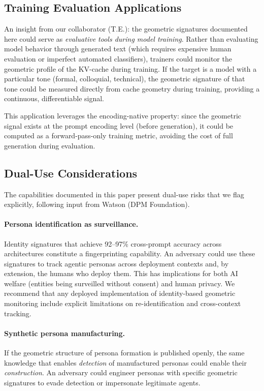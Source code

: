 \documentclass[11pt,a4paper]{article}
\begin{document}
\subsection{Training Evaluation Applications}

An insight from our collaborator (T.E.): the geometric signatures documented here could serve as \emph{evaluative tools during model training}. Rather than evaluating model behavior through generated text (which requires expensive human evaluation or imperfect automated classifiers), trainers could monitor the geometric profile of the KV-cache during training. If the target is a model with a particular tone (formal, colloquial, technical), the geometric signature of that tone could be measured directly from cache geometry during training, providing a continuous, differentiable signal.

This application leverages the encoding-native property: since the geometric signal exists at the prompt encoding level (before generation), it could be computed as a forward-pass-only training metric, avoiding the cost of full generation during evaluation.

\subsection{Dual-Use Considerations}

The capabilities documented in this paper present dual-use risks that we flag explicitly, following input from Watson (DPM Foundation).

\paragraph{Persona identification as surveillance.} Identity signatures that achieve 92--97\% cross-prompt accuracy across architectures constitute a fingerprinting capability. An adversary could use these signatures to track agentic personas across deployment contexts and, by extension, the humans who deploy them. This has implications for both AI welfare (entities being surveilled without consent) and human privacy. We recommend that any deployed implementation of identity-based geometric monitoring include explicit limitations on re-identification and cross-context tracking.

\paragraph{Synthetic persona manufacturing.} If the geometric structure of persona formation is published openly, the same knowledge that enables \emph{detection} of manufactured personas could enable their \emph{construction}. An adversary could engineer personas with specific geometric signatures to evade detection or impersonate legitimate agents.
\end{document}
